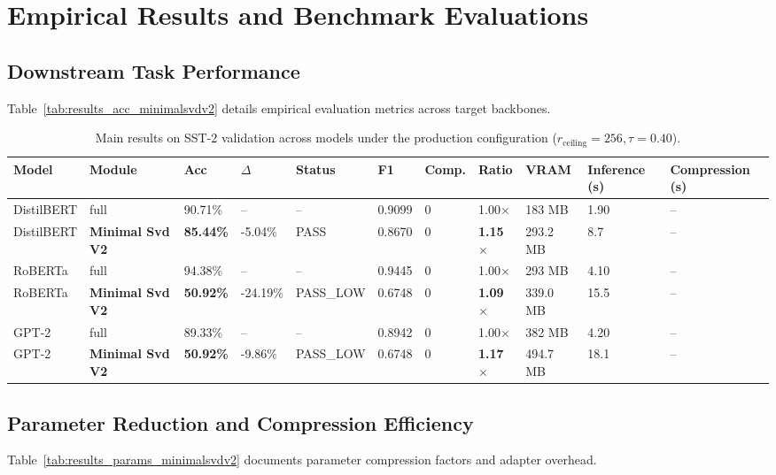 \section{Empirical Results and Benchmark Evaluations}

\subsection{Downstream Task Performance}
Table~\ref{tab:results_acc_minimalsvdv2} details empirical evaluation metrics across target backbones.

\begin{table}[t]
\centering
\small
\begin{tabular}{lllllllllll}
\toprule
\textbf{Model} & \textbf{Module} & \textbf{Acc} & \textbf{$\Delta$} & \textbf{Status} & \textbf{F1} & \textbf{Comp.} & \textbf{Ratio} & \textbf{VRAM} & \textbf{Inference (s)} & \textbf{Compression (s)} \\
\midrule
DistilBERT & full & 90.71\% & -- & -- & 0.9099 & 0 & 1.00$\times$ & 183 MB & 1.90 & -- \\
DistilBERT & \textbf{Minimal Svd V2} & \textbf{85.44\%} & -5.04\% & PASS & 0.8670 & 0 & \textbf{1.15$\times$} & 293.2 MB & 8.7 & -- \\
RoBERTa & full & 94.38\% & -- & -- & 0.9445 & 0 & 1.00$\times$ & 293 MB & 4.10 & -- \\
RoBERTa & \textbf{Minimal Svd V2} & \textbf{50.92\%} & -24.19\% & PASS\_LOW & 0.6748 & 0 & \textbf{1.09$\times$} & 339.0 MB & 15.5 & -- \\
GPT-2 & full & 89.33\% & -- & -- & 0.8942 & 0 & 1.00$\times$ & 382 MB & 4.20 & -- \\
GPT-2 & \textbf{Minimal Svd V2} & \textbf{50.92\%} & -9.86\% & PASS\_LOW & 0.6748 & 0 & \textbf{1.17$\times$} & 494.7 MB & 18.1 & -- \\
\bottomrule
\end{tabular}
\caption{Main results on SST-2 validation across models under the production configuration ($r_{\mathrm{ceiling}}=256, \tau=0.40$).}
\label{tab:main_sst2}
\end{table}

\subsection{Parameter Reduction and Compression Efficiency}
Table~\ref{tab:results_params_minimalsvdv2} documents parameter compression factors and adapter overhead.


